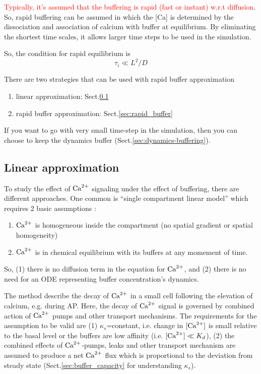 \textcolor{red}{Typically, it's assumed that the buffering is rapid (fast or
instant) w.r.t diffusion}. So, rapid buffering can be assumed in which the [Ca]
is determined by the dissociation and association of calcium with buffer at
equilibrium. By eliminating the shortest time scales, it allows larger time
steps to be used in the simulation.

So, the condition for rapid equilibrium is
\begin{equation}
  \label{eq:1097}
  \tau_i \ll L^2/D
\end{equation}

There are two strategies that can be used with rapid buffer approximation
\begin{enumerate}
  \item linear approximation: Sect.\ref{sec:linear_buffer}
  \item rapid buffer approximation: Sect.\ref{sec:rapid_buffer}
\end{enumerate}

If you want to go with very small time-step in the simulation, then you can
choose to keep the dynamics buffer (Sect.\ref{sec:dynamics-buffering}).

\subsection{Linear approximation}
\label{sec:linear_buffer}

To study the effect of ${\text{Ca}^{2+}}$ signaling under the effect of buffering, there are
different approaches. One common is ``single compartment linear model'' which
requires 2 basic assumptions \citep{Neher1998}:
\begin{enumerate}
  \item ${\text{Ca}^{2+}}$ is homogeneous inside the compartment (no spatial gradient or
  spatial homogeneity)
  \item ${\text{Ca}^{2+}}$ is in chemical equilibrium with its buffers at any momement of
  time.
\end{enumerate}
So, (1) there is no diffusion term in the equation for ${\text{Ca}^{2+}}$, and (2) there  is
no need for an ODE representing buffer concentration's dynamics.

The method describe the decay of ${\text{Ca}^{2+}}$ in a small cell following the elevation
of calcium, e.g. during AP. Here, the decay of ${\text{Ca}^{2+}}$ signal is governed by
combined action of ${\text{Ca}^{2+}}$ pumps and other transport mechanisms. The requirements
for the assumption to be valid are (1) $\kappa_s$=constant, i.e. change in
$[{\text{Ca}^{2+}}]$ is small relative to the basal level or the buffers are low affinity
(i.e. $[{\text{Ca}^{2+}}]\ll K_{d}$), (2) the combined effects of ${\text{Ca}^{2+}}$-pumps, leaks and
other transport mechanism are assumed to produce a net ${\text{Ca}^{2+}}$ flux which is
proportional to the deviation from steady state (Sect.\ref{sec:buffer_capacity}
for understanding $\kappa_s$).

